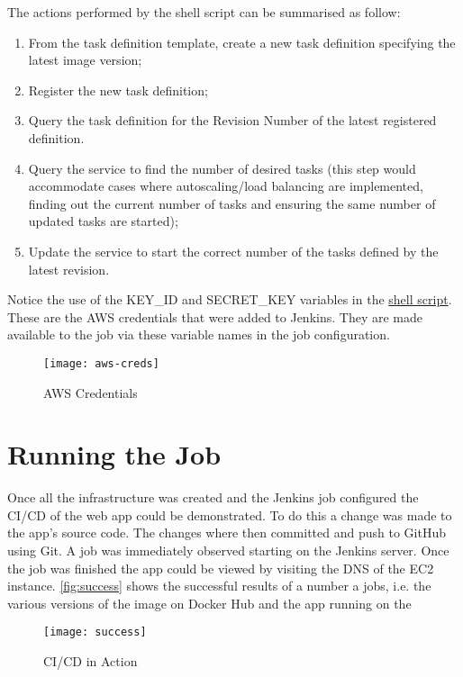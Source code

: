 		The actions performed by the shell script can be summarised as follow:
		\begin{enumerate}
			\item From the task definition template, create a new task definition specifying the latest image version;
			\item Register the new task definition;
			\item Query the task definition for the Revision Number of the latest registered definition.
			\item Query the service to find the number of desired tasks (this step would accommodate cases where autoscaling/load balancing are implemented, finding out the current number of tasks and ensuring the same number of updated tasks are started);
			\item Update the service to start the correct number of the tasks defined by the latest revision.
		\end{enumerate}
		Notice the use of the KEY\_ID and SECRET\_KEY variables in the \hyperref[shell-script]{shell script}. These are the AWS credentials that were added to Jenkins. They are made available to the job via these variable names in the job configuration.
		
		\begin{figure}[H]
			\caption{AWS Credentials}
			\centering
			\texttt{[image: aws-creds]}
			\label{fig:aws-creds}
		\end{figure}

	\section{Running the Job}
	Once all the infrastructure was created and the Jenkins job configured the CI/CD of the web app could be demonstrated. To do this a change was made to the app's source code. The changes where then committed and push to GitHub using Git. A job was immediately observed starting on the Jenkins server. Once the job was finished the app could be viewed by visiting the DNS of the EC2 instance. \autoref{fig:success} shows the successful results of a number a jobs, i.e. the various versions of the image on Docker Hub and the app running on the 
	
	\begin{figure}[H]
		\caption{CI/CD in Action}
		\centering
		\texttt{[image: success]}
		\label{fig:success}
	\end{figure}
	
	